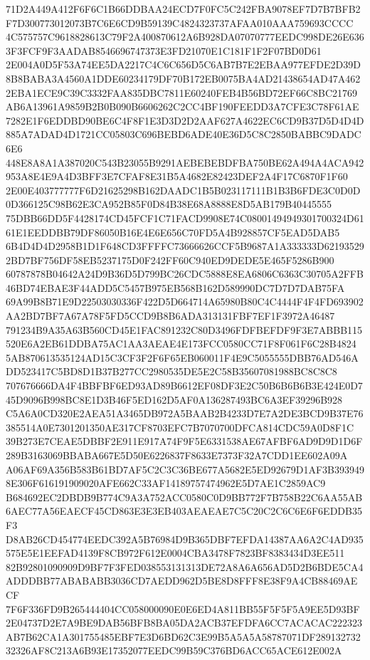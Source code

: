 \documentclass[UTF8,fontset=fandol,zihao=-4,a4paper]{ctexart}
\begin{document}
{{71D2A449A412F6F6C1B66DDBAA24ECD7F0FC5C242FBA9078EF7D7B7BFB2F7D300773012073B7C6E6CD9B59139C4824323737AFAA010AAA759693CCCC
4C575757C9618828613C79F2A400870612A6B928DA07070777EEDC998DE26E6363F3FCF9F3AADAB8546696747373E3FD21070E1C181F1F2F07BD0D61
2E004A0D5F53A74EE5DA2217C4C6C656D5C6AB7B7E2EBAA977EFDE2D39D8B8BABA3A4560A1DDE60234179DF70B172EB0075BA4AD21438654AD47A462
2EBA1ECE9C39C3332FAA835DBC7811E60240FEB4B56BD72EF66C8BC21769AB6A13961A9859B2B0B090B6606262C2CC4BF190FEEDD3A7CFE3C78F61AE
7282E1F6EDDBD90BE6C4F8F1E3D3D2D2AAF627A4622EC6CD9B37D5D4D4D885A7ADAD4D1721CC05803C696BEBD6ADE40E36D5C8C2850BABBC9DADC6E6
448E8A8A1A387020C543B23055B9291AEBEBEBDFBA750BE62A494A4ACA942953A8E4E9A4D3BFF3E7CFAF8E31B5A4682E82423DEF2A4F17C6870F1F60
2E00E403777777F6D21625298B162DAADC1B5B023117111B1B3B6FDE3C0D0D0D366125C98B62E3CA952B85F0D84B38E68A8888E8D5AB179B40445555
75DBB66DD5F4428174CD45FCF1C71FACD9908E74C08001494949301700324D6161E1EEDDBB79DF86050B16E4E6E656C70FD5A4B928857CF5EAD5DAB5
6B4D4D4D2958B1D1F648CD3FFFFC73666626CCF5B9687A1A333333D621935292BD7BF756DF58EB5237175D0F242FF60C940ED9DEDE5E465F5286B900
60787878B04642A24D9B36D5D799BC26CDC5888E8EA6806C6363C30705A2FFB46BD74EBAE3F44ADD5C5457B975EB568B162D589990DC7D7D7DAB75FA
69A99B8B71E9D22503030336F422D5D664714A65980B80C4C4444F4F4FD693902AA2BD7BF7A67A78F5FD5CCD9B8B6ADA313131FBF7EF1F3972A46487
791234B9A35A63B560CD45E1FAC891232C80D3496FDFBEFDF9F3E7ABBB115520E6A2EB61DDBA75AC1AA3AEAE4E173FCC0580CC71F8F061F6C28B4824
5AB870613535124AD15C3CF3F2F6F65EB060011F4E9C5055555DBB76AD546ADD523417C5BD8D1B37B277CC2980535DE5E2C58B35607081988BC8C8C8
707676666DA4F4BBFBF6ED93AD89B6612EF08DF3E2C50B6B6B6B3E424E0D745D9096B998BC8E1D3B46F5ED162D5AF0A136287493BC6A3EF39296B928
C5A6A0CD320E2AEA51A3465DB972A5BAAB2B4233D7E7A2DE3BCD9B37E76385514A0E7301201350AE317CF8703EFC7B7070700DFCA814CDC59A0D8F1C
39B273E7CEAE5DBBF2E911E917A74F9F5E6331538AE67AFBF6AD9D9D1D6F289B3163069BBABA667E5D50E6226837F8633E7373F32A7CDD1EE602A09A
A06AF69A356B583B61BD7AF5C2C3C36BE677A5682E5ED92679D1AF3B3939498E306F616191909020AFE662C33AF14189757474962E5D7AE1C2859AC9
B684692EC2DBDB9B774C9A3A752ACC0580C0D9BB772F7B758B22C6AA55AB6AEC77A56EAECF45CD863E3E3EB403AEAEAE7C5C20C2C6C6E6F6EDDB35F3
D8AB26CD454774EEDC392A5B76984D9B365DBF7EFDA14387AA6A2C4AD935575E5E1EEFAD4139F8CB972F612E0004CBA3478F7823BF8383434D3EE511
82B92801090909D9BF7F3FED038553131313DE72A8A6A656AD5D2B6BDE5CA4ADDDBB77ABABABB3036CD7AEDD962D5BE8D8FFF8E38F9A4CB88469AECF
7F6F336FD9B265444404CC058000090E0E6ED4A811BB55F5F5F5A9EE5D93BF2E04737D2E7A9BE9DAB56BFB8BA05DA2ACB37EFDFA6CC7ACACAC222323
AB7B62CA1A301755485EBF7E3D6BD62C3E99B5A5A5A58787071DF28913273232326AF8C213A6B93E17352077EEDC99B59C376BD6ACC65ACE612E002A
}}
\end{document}
